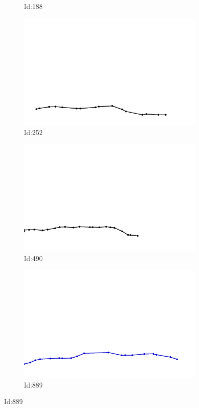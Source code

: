 \documentclass[12pt,twoside]{report}
\begin{document}
\begin{figure}
\begin{subfigure}[b]{0.20\textwidth}
\caption{Id:188}
\end{subfigure}
\begin{subfigure}[b]{0.20\textwidth}
\centering
\includegraphics[width=\textwidth]{../../trajectories/252.png}
\caption{Id:252}
\end{subfigure}
\begin{subfigure}[b]{0.20\textwidth}
\centering
\includegraphics[width=\textwidth]{../../trajectories/490.png}
\caption{Id:490}
\end{subfigure}
\begin{subfigure}[b]{0.20\textwidth}
\centering
\includegraphics[width=\textwidth]{../../trajectories/889.png}
\caption{Id:889}
\end{subfigure}
\end{figure}
\end{document}
